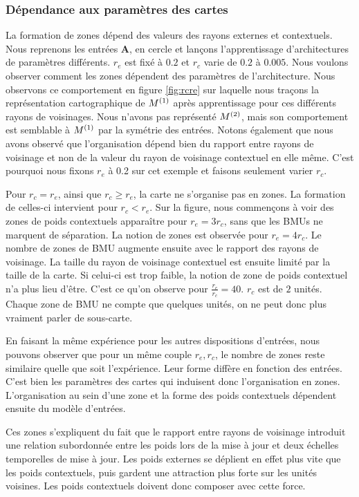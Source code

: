 \documentclass[../main]{subfiles}
\begin{document}
\subsubsection{Dépendance aux paramètres des cartes}

La formation de zones dépend des valeurs des rayons externes et contextuels.
Nous reprenons les entrées \textbf{A}, en cercle et lançons l'apprentissage d'architectures de paramètres différents. $r_e$ est fixé à $0.2$ et $r_c$ varie de $0.2$ à $0.005$. Nous voulons observer comment les zones dépendent des paramètres de l'architecture.
Nous observons ce comportement en figure \ref{fig:rcre} sur laquelle nous traçons la représentation cartographique de $M^{({1})}$ après apprentissage pour ces différents rayons de voisinages. Nous n'avons pas représenté $M^{({2})}$, mais son comportement est semblable à $M^{({1})}$ par la symétrie des entrées.
Notons également que nous avons observé que l'organisation dépend bien du rapport entre rayons de voisinage et non de la valeur du rayon de voisinage contextuel en elle même. C'est pourquoi nous fixons $r_e$ à 0.2 sur cet exemple et faisons seulement varier $r_c$.

Pour $r_c = r_e$, ainsi que $r_c \geq r_e$, la carte ne s'organise pas en zones. 
La formation de celles-ci intervient pour $r_c < r_e$. Sur la figure, nous commençons à voir des zones de poids contextuels apparaître pour $r_e = 3r_c$, sans que les BMUs ne marquent de séparation. La notion de zones est observée pour $r_e = 4r_c$.
Le nombre de zones de BMU augmente ensuite avec le rapport des rayons de voisinage. La taille du rayon de voisinage contextuel est ensuite limité par la taille de la carte. Si celui-ci est trop faible, la notion de zone de poids contextuel n'a plus lieu d'être. C'est ce qu'on observe pour $\frac{r_e}{r_c} = 40$. $r_c$ est de $2$ unités. Chaque zone de BMU ne compte que quelques unités, on ne peut donc plus vraiment parler de sous-carte.

En faisant la même expérience pour les autres dispositions d'entrées, nous pouvons observer que pour un même couple $r_e,r_c$, le nombre de zones reste similaire quelle que soit l'expérience. Leur forme diffère en fonction des entrées.
C'est bien les paramètres des cartes qui induisent donc l'organisation en zones.
L'organisation au sein d'une zone et la forme des poids contextuels dépendent ensuite du modèle d'entrées.

Ces zones s'expliquent du fait que le rapport entre rayons de voisinage introduit une relation subordonnée entre les poids lors de la mise à jour et deux échelles temporelles de mise à jour. Les poids externes se déplient en effet plus vite que les poids contextuels, puis gardent une \og attraction \fg{} plus forte sur les unités voisines. Les poids contextuels doivent donc composer avec cette force.
\end{document}
